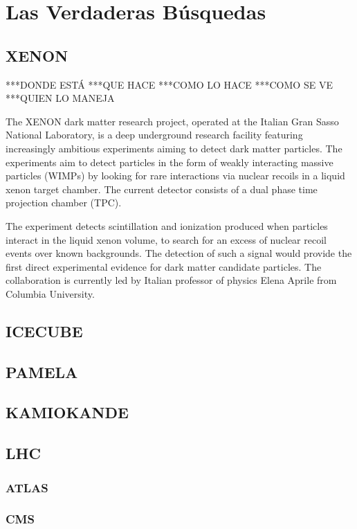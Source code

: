 \chapter{Las Verdaderas Búsquedas}

\section{XENON}

***DONDE ESTÁ
***QUE HACE
***COMO LO HACE
***COMO SE VE
***QUIEN LO MANEJA

The XENON dark matter research project, operated at the Italian Gran Sasso National Laboratory, is a deep underground research facility featuring increasingly ambitious experiments aiming to detect dark matter particles. The experiments aim to detect particles in the form of weakly interacting massive particles (WIMPs) by looking for rare interactions via nuclear recoils in a liquid xenon target chamber. The current detector consists of a dual phase time projection chamber (TPC).

The experiment detects scintillation and ionization produced when particles interact in the liquid xenon volume, to search for an excess of nuclear recoil events over known backgrounds. The detection of such a signal would provide the first direct experimental evidence for dark matter candidate particles. The collaboration is currently led by Italian professor of physics Elena Aprile from Columbia University. 

\section{ICECUBE}

\section{PAMELA}

\section{KAMIOKANDE}

\section{LHC}
    \subsection{ATLAS}
    \subsection{CMS}
